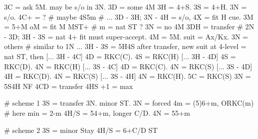 3C = ask 5M. may be s/o in 3N.
    3D = some 4M
        3H = 4+S. 3S = 4+H. 3N = s/o. 4C+ = ?  # maybe 4S5m
        # ... 3D - 3H; 3N - 4H = s/o, 4X = fit H cue.
    3M = 5+M
        oM = fit M MST+  # m = nat ST ?
    3N = no 4M
3DH = transfer  # 2N - 3D; 3H - 3S = nat
    4+ fit must super-accept. 4M = 5M. suit = Ax/Kx. 3N = others  # similar to 1N
    ... 3H - 3S = 5H4S
    after transfer, new suit at 4-level = nat ST, then
        [... 3H - 4C] 4D = RKC(C). 4S = RKC(H)
        [... 3H - 4D] 4S = RKC(D). 4N = RKC(H)
        [... 3S - 4C] 4D = RKC(C). 4N = RKC(S)
        [... 3S - 4D] 4H = RKC(D). 4N = RKC(S)
        [... 3S - 4H] 4N = RKC(H). 5C = RKC(S)
3N = 5S4H NF
4CD = transfer 4HS
    +1 = max

# scheme 1
3S = transfer 3N. minor ST.
    3N = forced
        4m = (5)6+m, ORKC(m)  # here min = 2-m
        4H/S = 54+m, longer C/D. 4N = 55+m

# scheme 2
3S = minor Stay
4H/S = 6+C/D ST